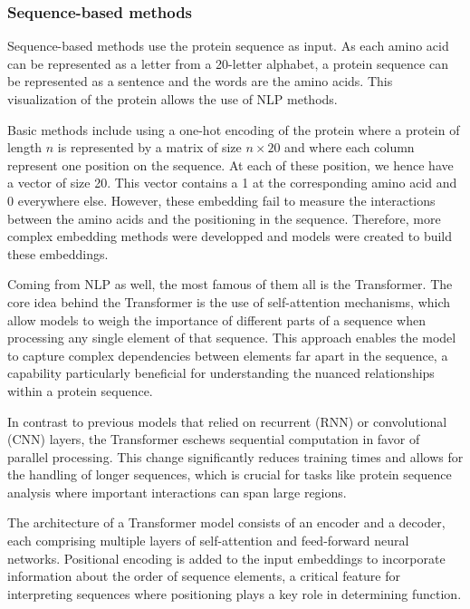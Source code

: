 \subsubsection{Sequence-based methods}

Sequence-based methods use the protein sequence as input. \cite{WU202118,ijms222111741} As each amino acid can be represented as a letter from a 20-letter alphabet, a protein sequence can be represented as a sentence and the words are the amino acids. This visualization of the protein allows the use of NLP methods.

Basic methods include using a one-hot encoding of the protein where a protein of length $n$ is represented by a matrix of size $n\times 20$ and where each column represent one position on the sequence. At each of these position, we hence have a vector of size 20. This vector contains a 1 at the corresponding amino acid and 0 everywhere else. \cite{ElAbd2020} However, these embedding fail to measure the interactions between the amino acids and the positioning in the sequence. Therefore, more complex embedding methods were developped and models were created to build these embeddings. 

Coming from NLP as well, the most famous of them all is the Transformer. \cite{NIPS2017_3f5ee243} The core idea behind the Transformer is the use of self-attention mechanisms, which allow models to weigh the importance of different parts of a sequence when processing any single element of that sequence. This approach enables the model to capture complex dependencies between elements far apart in the sequence, a capability particularly beneficial for understanding the nuanced relationships within a protein sequence.

In contrast to previous models that relied on recurrent (RNN) or convolutional (CNN) layers, the Transformer eschews sequential computation in favor of parallel processing. This change significantly reduces training times and allows for the handling of longer sequences, which is crucial for tasks like protein sequence analysis where important interactions can span large regions.

The architecture of a Transformer model consists of an encoder and a decoder, each comprising multiple layers of self-attention and feed-forward neural networks. Positional encoding is added to the input embeddings to incorporate information about the order of sequence elements, a critical feature for interpreting sequences where positioning plays a key role in determining function.

